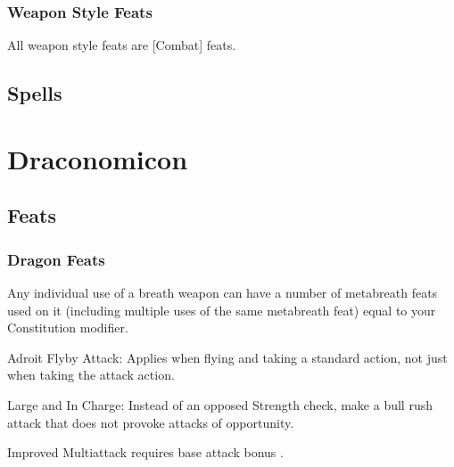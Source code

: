 \subsubsection{Weapon Style Feats}
All weapon style feats are [Combat] feats.
\subsection{Spells}
\section{Draconomicon}
\subsection{Feats}
\subsubsection{Dragon Feats}
Any individual use of a breath weapon can have a number of metabreath feats used on it (including multiple uses of the same metabreath feat) equal to your Constitution modifier.
\begin{itemize*}
\item Adroit Flyby Attack: Applies when flying and taking a standard action, not just when taking the attack action.
\item Large and In Charge: Instead of an opposed Strength check, make a bull rush attack that does not provoke attacks of opportunity.
\item Improved Multiattack requires base attack bonus .
\end{itemize*}
